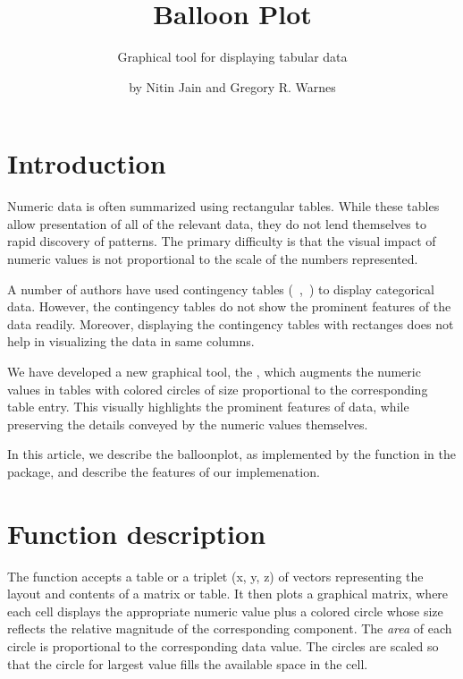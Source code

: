 \documentclass[a4paper]{report}
\begin{document}
\begin{article}
\author{by Nitin Jain and Gregory R. Warnes}
\title{Balloon Plot}
\subtitle{Graphical tool for displaying tabular data}

\maketitle

\section*{Introduction}

Numeric data is often summarized using rectangular tables. While
these tables allow presentation of all of the relevant data, they do
not lend themselves to rapid discovery of patterns. The
primary difficulty is that the visual impact of numeric values is
not proportional to the scale of the numbers represented.

A number of authors have
used contingency tables (~\cite{Friendly},~\cite{Hartigan})
to display categorical data. However, the contingency tables do not
show the prominent features of the data readily. Moreover,
displaying the contingency tables with rectanges does not help in
visualizing the data in same columns.

We have developed a new graphical tool, the ,
which augments the numeric values in tables with colored circles of
size proportional to the corresponding table entry. This visually
highlights the prominent features of data, while preserving the
details conveyed by the numeric values themselves.

In this article, we describe the balloonplot, as
implemented by the  function in the
 package, and describe the features of our
implemenation.


\section*{Function description}

The function  accepts a table or a triplet (x,
y, z) of vectors representing the layout and contents of a matrix or
table.  It then plots a graphical matrix, where each cell displays
the appropriate numeric value plus a colored circle whose size
reflects the relative magnitude of the corresponding component. The
\emph{area} of each circle is proportional to the corresponding data
value. The circles are scaled so that the circle for largest value
fills the available space in the cell.


\end{article}
\end{document}

